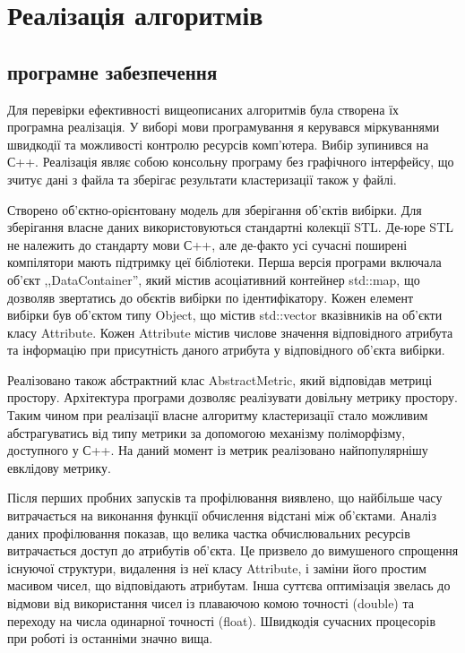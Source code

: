 \chapter{Реалізація алгоритмів}                
        \section {програмне забезпечення}
            Для перевірки ефективності вищеописаних алгоритмів була створена їх програмна реалізація. У виборі мови програмування я керувався міркуваннями швидкодії та можливості контролю ресурсів комп'ютера. Вибір зупинився на С++. Реалізація являє собою консольну програму без графічного інтерфейсу, що зчитує дані з файла та зберігає результати кластеризації також у файлі.
            
            
            Створено об'єктно-орієнтовану модель для зберігання об'єктів вибірки. Для зберігання власне даних використовуються стандартні колекції STL. Де-юре STL не належить до стандарту мови С++, але де-факто усі сучасні поширені компілятори мають підтримку цеї бібліотеки. Перша версія програми включала об'єкт ,,DataContainer'', який містив асоціативний контейнер std::map, що дозволяв звертатись до обєктів вибірки по ідентифікатору. Кожен елемент вибірки був об'єктом типу Object, що містив std::vector вказівників на об'єкти класу Attribute. Кожен Attribute містив числове значення відповідного атрибута та інформацію при присутність даного атрибута у відповідного об'єкта вибірки.
            
            Реалізовано також абстрактний клас AbstractMetric, який відповідав метриці простору. Архітектура програми дозволяє реалізувати довільну метрику простору. Таким чином при реалізації власне алгоритму кластеризації стало можливим абстрагуватись від типу метрики за допомогою механізму поліморфізму, доступного у С++. На даний момент із метрик реалізовано найпопулярнішу евклідову метрику.
            
            Після перших пробних запусків та профілювання виявлено, що найбільше часу витрачається на виконання функції обчислення відстані між об'єктами. Аналіз даних профілювання показав, що велика частка обчислювальних ресурсів витрачається доступ до атрибутів об'єкта. Це призвело до вимушеного спрощення існуючої структури, видалення із неї класу Attribute, і заміни його простим масивом чисел, що відповідають атрибутам. Інша суттєва оптимізація звелась до відмови від використання чисел із плаваючою комою точності (double) та переходу на числа одинарної точності (float). Швидкодія сучасних процесорів при роботі із останніми значно вища.
            
